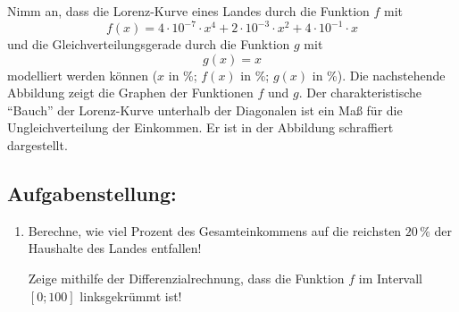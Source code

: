 \begin{langesbeispiel}
				Nimm an, dass die Lorenz-Kurve eines Landes durch die Funktion $f$ mit
				$$f(x)=4\cdot 10^{-7}\cdot x^4+2\cdot 10^{-3}\cdot x^2+4\cdot 10^{-1}\cdot x$$
				und die Gleichverteilungsgerade durch die Funktion $g$ mit
				$$g(x)=x$$
				modelliert werden können ($x$ in \%; $f(x)$ in \%; $g(x)$ in \%). Die nachstehende Abbildung zeigt die Graphen der Funktionen $f$ und $g$. Der charakteristische "`Bauch"' der Lorenz-Kurve unterhalb der Diagonalen ist ein Maß für die Ungleichverteilung der Einkommen. Er ist in der Abbildung schraffiert dargestellt.
				
				\begin{center}
				\end{center}

\subsection{Aufgabenstellung:}
\begin{enumerate}
	\item {} Berechne, wie viel Prozent des Gesamteinkommens auf die reichsten $20\,\%$ der Haushalte des Landes entfallen!
	
	Zeige mithilfe der Differenzialrechnung, dass die Funktion $f$ im Intervall $[0;100]$ linksgekrümmt ist!
	

\end{enumerate}
\end{langesbeispiel}
